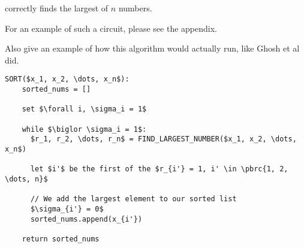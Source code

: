 \documentclass{article}
\begin{document}
\begin{lemma}
   correctly finds the largest of $n$ numbers.
  \label{lemma:largest_number}
\end{lemma}

For an example of such a circuit, please see the appendix.

Also give an example of how this algorithm would actually run, like Ghosh et al did.

\begin{lstlisting}[label={alg:sort}, caption={Sorting algorithm with parallel comparison.}]
  SORT($x_1, x_2, \dots, x_n$):
    sorted_nums = []

    set $\forall i, \sigma_i = 1$

    while $\biglor \sigma_i = 1$:
      $r_1, r_2, \dots, r_n$ = FIND_LARGEST_NUMBER($x_1, x_2, \dots, x_n$)

      let $i'$ be the first of the $r_{i'} = 1, i' \in \pbrc{1, 2, \dots, n}$

      // We add the largest element to our sorted list
      $\sigma_{i'} = 0$
      sorted_nums.append(x_{i'})

    return sorted_nums
\end{lstlisting}
\end{document}
